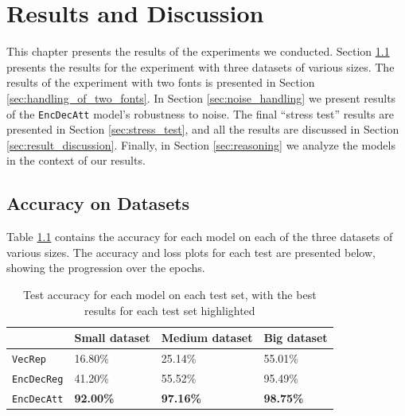 
\chapter{Results and Discussion}
\label{ch:results}
This chapter presents the results of the experiments we conducted. Section \ref{sec:accuracy_on_datasets_results} presents the results for the experiment with three datasets of various sizes. The results of the experiment with two fonts is presented in Section \ref{sec:handling_of_two_fonts}. In Section \ref{sec:noise_handling} we present results of the {\tt EncDecAtt} model's robustness to noise. The final ``stress test'' results are presented in Section \ref{sec:stress_test}, and all the results are discussed in Section \ref{sec:result_discussion}. Finally, in Section \ref{sec:reasoning} we analyze the models in the context of our results.


\section{Accuracy on Datasets}
\label{sec:accuracy_on_datasets_results}
Table \ref{table:accuracy_model_data_sets} contains the accuracy for each model on each of the three datasets of various sizes. The accuracy and loss plots for each test are presented below, showing the progression over the epochs.

\begin{table}[H]
    \centering
    \begin{tabular}{|l|l|l|l|}
        \hline 
                                        & \textbf{Small dataset}          & \textbf{Medium dataset}         & \textbf{Big dataset}            \\ \hline
        {\tt VecRep }                   & 16.80\%                         & 25.14\%                         & 55.01\%                         \\ \hline
        {\tt EncDecReg}                 & 41.20\%                         & 55.52\%                         & 95.49\%                         \\ \hline
        {\tt EncDecAtt}                 & \textbf{92.00\%}                & \textbf{97.16\%}                & \textbf{98.75\%}                \\ \hline
    \end{tabular}
    \captionsetup{justification=centering}
    \caption{Test accuracy for each model on each test set, with the best results for each test set highlighted}
    \label{table:accuracy_model_data_sets}
\end{table}

